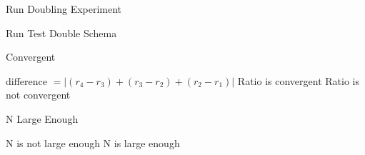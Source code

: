   \begin{algorithm}[t]
    \caption{Run Doubling Experiment}
    \begin{algorithmic}
      \STATE Run Test
      \ENDFOR
      \STATE Double Schema
      \ENDWHILE
    \end{algorithmic}
    \label{alg:main}
  \end{algorithm}

  \begin{algorithm}[t]
    \caption{Convergent}
    \begin{algorithmic}
      \STATE difference $= |(r_4 - r_3) + (r_3 -r_2) + (r_2 - r_1)|$
      \RETURN Ratio is convergent
      \ELSE
      \RETURN Ratio is not convergent
      \ENDIF
    \end{algorithmic}
    \label{alg:convergence}
  \end{algorithm}

  \begin{algorithm}[t]
    \caption{N Large Enough}
    \begin{algorithmic}
      \RETURN N is not large enough
      \ENDIF
      \ENDIF
      \RETURN N is large enough
    \end{algorithmic}
    \label{alg:tuning}
  \end{algorithm}
